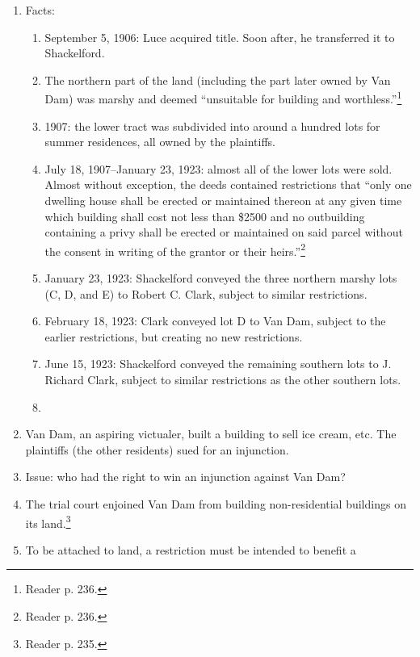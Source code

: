 \begin{enumerate}
    \item Facts:
    \begin{enumerate}
        \item September 5, 1906: Luce acquired title. Soon after, he 
        transferred it to Shackelford.
        \item The northern part of the land (including the part later owned by 
        Van Dam) was marshy and deemed ``unsuitable for building and 
        worthless.''\footnote{Reader p. 236.}
        \item 1907: the lower tract was subdivided into around a hundred lots 
        for summer residences, all owned by the plaintiffs.
        \item July 18, 1907--January 23, 1923: almost all of the lower lots 
        were sold. Almost without exception, the deeds contained restrictions 
        that ``only one dwelling house shall be erected or maintained thereon 
        at any given time which building shall cost not less than \$2500 and 
        no outbuilding containing a privy shall be erected or maintained on 
        said parcel without the consent in writing of the grantor or their 
        heirs.''\footnote{Reader p. 236.}
        \item January 23, 1923: Shackelford conveyed the three northern marshy 
        lots (C, D, and E) to Robert C. Clark, subject to similar 
        restrictions.
        \item February 18, 1923: Clark conveyed lot D to Van Dam, subject to 
        the earlier restrictions, but creating no new restrictions. 
        \item June 15, 1923: Shackelford conveyed the remaining southern lots 
        to J. Richard Clark, subject to similar restrictions as the other 
        southern lots.
        \item 
    \end{enumerate}
    \item Van Dam, an aspiring victualer, built a building to sell ice cream, 
    etc. The plaintiffs (the other residents) sued for an injunction.
    \item Issue: who had the right to win an injunction against Van Dam?
    \item The trial court enjoined Van Dam from building non-residential 
    buildings on its land.\footnote{Reader p. 235.}
    \item To be attached to land, a restriction must be intended to benefit a 

\end{enumerate}
